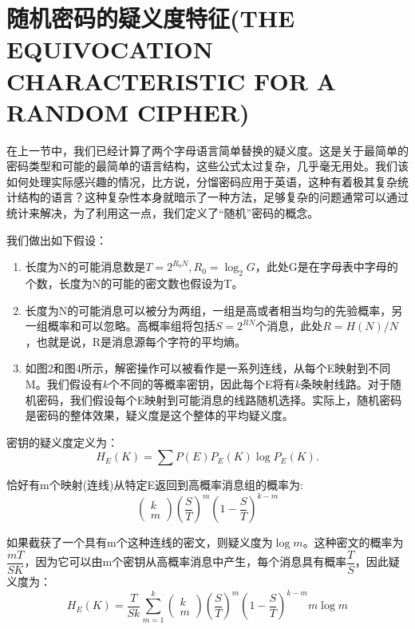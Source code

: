 \documentclass[]{article}
\begin{document}
\newpage
%   
%

\section{随机密码的疑义度特征(THE EQUIVOCATION CHARACTERISTIC FOR A RANDOM CIPHER)}

在上一节中，我们已经计算了两个字母语言简单替换的疑义度。这是关于最简单的密码类型和可能的最简单的语言结构，这些公式太过复杂，几乎毫无用处。我们该如何处理实际感兴趣的情况，比方说，分馏密码应用于英语，这种有着极其复杂统计结构的语言？这种复杂性本身就暗示了一种方法，足够复杂的问题通常可以通过统计来解决，为了利用这一点，我们定义了“随机”密码的概念。

我们做出如下假设：
\begin{enumerate}
	\item 长度为N的可能消息数是$T=2^{R_0 N},R_0=\log_2{G}$，此处G是在字母表中字母的个数，长度为N的可能的密文数也假设为T。
	\item 长度为N的可能消息可以被分为两组，一组是高或者相当均匀的先验概率，另一组概率和可以忽略。高概率组将包括$S=2^{RN}$个消息，此处$R=H(N)/N$，也就是说，R是消息源每个字符的平均熵。
	\item 如图2和图4所示，解密操作可以被看作是一系列连线，从每个E映射到不同M。我们假设有$k$个不同的等概率密钥，因此每个E将有$k$条映射线路。对于随机密码，我们假设每个E映射到可能消息的线路随机选择。实际上，随机密码是密码的整体效果，疑义度是这个整体的平均疑义度。
\end{enumerate}

密钥的疑义度定义为：
\[H_E(K)=\sum {P(E) P_E(K) \log{P_E(K)}}.\]

恰好有m个映射(连线)从特定E返回到高概率消息组的概率为:
\[
\begin{pmatrix}
k\\
m
\end{pmatrix}\left(\frac{S}{T}\right)^m \left(1-\frac{S}{T}\right)^{k-m}
\]

如果截获了一个具有m个这种连线的密文，则疑义度为$\log{m}$。这种密文的概率为$\dfrac{mT}{SK}$，因为它可以由m个密钥从高概率消息中产生，每个消息具有概率$\dfrac{T}{S}$，因此疑义度为：
\[H_E(K) = \dfrac{T}{Sk} \sum_{m=1}^{k} \begin{pmatrix}
k\\
m
\end{pmatrix} \left(\dfrac{S}{T}\right)^m \left(1-\dfrac{S}{T}\right)^{k-m} m \log{m} \]
\end{document}
